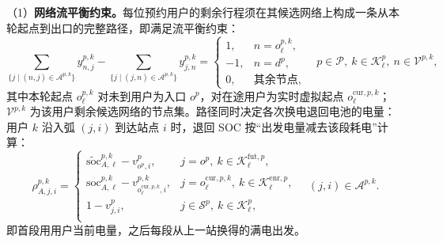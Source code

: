 \documentclass[12pt,a4paper,UTF8]{ctexart}
\begin{document}
 
（1）\textbf{网络流平衡约束。}每位预约用户的剩余行程须在其候选网络上构成一条从本轮起点到出口的完整路径，即满足流平衡约束：
\begin{equation}
\sum_{\{j\mid(n,j)\in\mathcal A^{p,k}\}}
y_{n,j}^{p,k}
-
\sum_{\{j\mid(j,n)\in\mathcal A^{p,k}\}}
y_{j,n}^{p,k}
=
\begin{cases}
1,&n=o_\ell^{p,k},\\
-1,&n=d^p,\\
0,&\text{其余节点},
\end{cases}
\quad
p\in\mathcal P,\ k\in\mathcal K_\ell^p,\ n\in\mathcal V^{p,k},
\label{eq:flow}
\end{equation}
其中本轮起点 $o_\ell^{p,k}$ 对未到用户为入口 $o^p$，对在途用户为实时虚拟起点 $o_\ell^{\mathrm{cur},p,k}$；$\mathcal V^{p,k}$ 为该用户剩余候选网络的节点集。路径同时决定各次换电退回电池的电量：用户 $k$ 沿入弧 $(j,i)$ 到达站点 $i$ 时，退回 SOC 按“出发电量减去该段耗电”计算：
\begin{equation}
\rho_{A,j,i}^{p,k}
=
\begin{cases}
\widetilde{\mathrm{soc}}_{A,\ell}^{p,k}-v_{o^p,i}^{p},
&j=o^p,\ k\in\mathcal K_\ell^{\mathrm{fut},p},\\[2pt]
\mathrm{soc}_{A,\ell}^{p,k}
-v_{o_\ell^{\mathrm{cur},p,k},i}^{p,k},
&j=o_\ell^{\mathrm{cur},p,k},\ k\in\mathcal K_\ell^{\mathrm{enr},p},\\[2pt]
1-v_{j,i}^{p},
&j\in\mathcal S^p,\ k\in\mathcal K_\ell^{p},\\[2pt]
\end{cases}
\quad (j,i)\in\mathcal A^{p,k}.
\label{eq:return_soc}
\end{equation}
即首段用用户当前电量，之后每段从上一站换得的满电出发。
\end{document}
